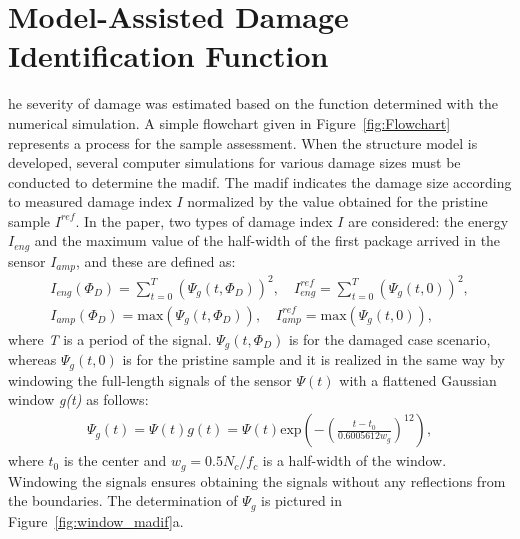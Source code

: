 \section{Model-Assisted Damage Identification Function}
\label{sec:madif}

he severity of damage was estimated based on the function determined with the numerical simulation.
A simple flowchart given in Figure~\ref{fig:Flowchart} represents a process for the sample assessment.
When the structure model is developed, several computer simulations for various damage sizes must be conducted to determine the \ac{madif}.
The \ac{madif} indicates the damage size according to measured damage index \(I\) normalized by the value obtained for the pristine sample \(I^{ref}\).
In the paper, two types of damage index \(I\) are considered: the energy \(I_{eng}\) and the maximum value of the half-width of the first package arrived in the sensor \(I_{amp}\), and these are defined as:
\begin{eqnarray}
	I_{eng}(\Phi_D)=\sum_{t=0}^{T} \left (\Psi_g(t,\Phi_D)\right )^2,\quad I_{eng}^{ref}=\sum_{t=0}^{T} \left (\Psi_g(t,0)\right )^2,\\
	I_{amp}(\Phi_D)=\mathrm{max}\left ( \Psi_g(t,\Phi_D)\right ),\quad I_{amp}^{ref}=\mathrm{max}\left ( \Psi_g(t,0)\right ),
	\label{eq:I_amp}
\end{eqnarray}
where \textit{T} is a period of the signal.
\(\Psi_g(t,\Phi_D)\) is for the damaged case scenario, whereas \(\Psi_g(t,0)\) is for the pristine sample and it is realized in the same way by windowing the full-length signals of the sensor \(\Psi(t)\) with a flattened Gaussian window \emph{g(t)} as follows:
\begin{eqnarray}
	\Psi_g(t)=\Psi(t)g(t)= \Psi(t)\mathrm{exp}\left(-\left(\frac{t-t_0}{0.6005612w_g}\right) ^{12}\right),
	\label{eq:psi_g}
\end{eqnarray}
where \(t_0\) is the center and \(w_g=0.5N_c/f_c\) is a half-width of the window.
Windowing the signals ensures obtaining the signals without any reflections from the boundaries.
The determination of \(\Psi_g\) is pictured in Figure~\ref{fig:window_madif}a.

